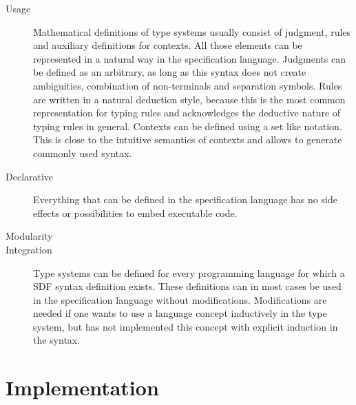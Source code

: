 \begin{description}
\item[Usage] Mathematical definitions of type systems usually consist
  of judgment, rules and auxiliary definitions for contexts. All
  those elements can be represented in a natural way in the
  specification language. Judgments can be defined as an arbitrary, as long
  as this syntax does not create ambiguities, combination of
  non-terminals and separation symbols. Rules are written in a natural
  deduction style, because this is the most common representation for
  typing rules and acknowledges the deductive nature of typing rules
  in general. Contexts can be defined using a set like
  notation. This is close to the intuitive semantics of contexts
  and allows to generate commonly used syntax.
\item[Declarative] Everything that can be defined in the specification
  language has no side effects or possibilities to embed executable
  code.
\item[Modularity] 
\item[Integration] Type systems can be defined for every programming
  language for which a SDF syntax definition exists. These definitions
  can in most cases be used in the specification language without
  modifications. Modifications are needed if one wants to use a
  language concept inductively in the type system, but has not
  implemented this concept with explicit induction in the
  syntax.
\end{description}
\section{Implementation}
\label{sec:generate-sdf}

